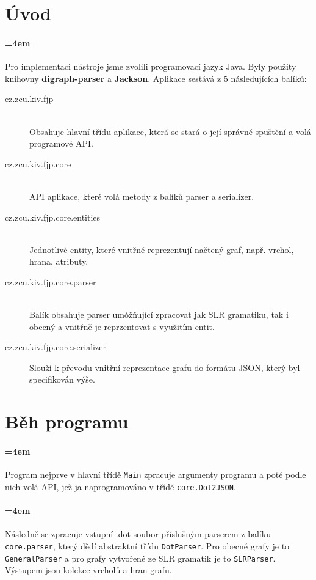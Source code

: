 \documentclass[
12pt,
a4paper,
pdftex,
czech,
titlepage
]{report}
\begin{document}
\section{Úvod}
\paragraph{\parindent=4em}{
Pro implementaci nástroje jsme zvolili programovací jazyk Java. Byly použity knihovny \textbf{digraph-parser} a \textbf{Jackson}. Aplikace sestává z 5 následujících balíků:

\begin{description}
 \item[cz.zcu.kiv.fjp] \hfill \\ Obsahuje hlavní třídu aplikace, která se stará o její správné spuštění a volá programové API.
 \item[cz.zcu.kiv.fjp.core] \hfill \\ API aplikace, které volá metody z balíků parser a serializer.
 \item[cz.zcu.kiv.fjp.core.entities] \hfill \\ Jednotlivé entity, které vnitřně reprezentují načtený graf, např. vrchol, hrana, atributy.
 \item[cz.zcu.kiv.fjp.core.parser] \hfill \\ Balík obsahuje parser umǒžňující zpracovat jak SLR gramatiku, tak i obecný a vnitřně je reprzentovat s využitím entit.
 \item[cz.zcu.kiv.fjp.core.serializer] \hfill Slouží k převodu vnitřní reprezentace grafu do formátu JSON, který byl specifikován výše.
\end{description}
}

\section{Běh programu}
\paragraph{\parindent=4em}{
Program nejprve v hlavní třídě \texttt{Main} zpracuje argumenty programu a poté podle nich volá API, jež ja naprogramováno v třídě \texttt{core.Dot2JSON}.
}

\paragraph{\parindent=4em}{
Následně se zpracuje vstupní .dot soubor příslušným parserem z balíku \texttt{core.parser}, který dědí abstraktní třídu \texttt{DotParser}. Pro obecné grafy je to \texttt{GeneralParser} a pro grafy vytvořené ze SLR gramatik je to \texttt{SLRParser}. Výstupem jsou kolekce vrcholů a hran grafu.
}
\end{document}
